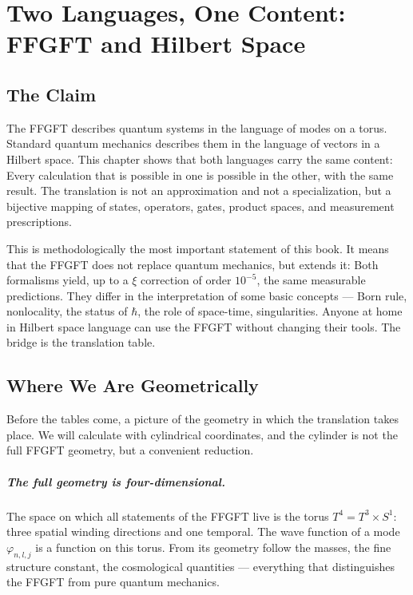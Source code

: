 \chapter{Two Languages, One Content: FFGFT and Hilbert Space}
\label{ch:hilbert}

\section{The Claim}

The FFGFT describes quantum systems in the language of modes on a
torus. Standard quantum mechanics describes them in the language of
vectors in a Hilbert space. This chapter shows that both languages
carry the same content: Every calculation that is possible in one
is possible in the other, with the same result. The translation is
not an approximation and not a specialization, but a bijective
mapping of states, operators, gates, product spaces, and
measurement prescriptions.

This is methodologically the most important statement of this book. It means
that the FFGFT does not replace quantum mechanics, but extends it:
Both formalisms yield, up to a $\xi$ correction of order
$10^{-5}$, the same measurable predictions. They differ in the
interpretation of some basic concepts --- Born rule, nonlocality, the status
of $\hbar$, the role of space-time, singularities. Anyone at home in
Hilbert space language can use the FFGFT without changing their
tools. The bridge is the translation table.

\section{Where We Are Geometrically}

Before the tables come, a picture of the geometry in which the translation
takes place. We will calculate with cylindrical coordinates, and the cylinder
is not the full FFGFT geometry, but a convenient reduction.

\paragraph{The full geometry is four-dimensional.} The space on which
all statements of the FFGFT live is the torus $T^4 = T^3\times S^1$: three
spatial winding directions and one temporal. The wave function
of a mode $\varphi_{n,l,j}$ is a function on this torus. From
its geometry follow the masses, the fine structure constant, the
cosmological quantities --- everything that distinguishes the FFGFT from pure
quantum mechanics.

